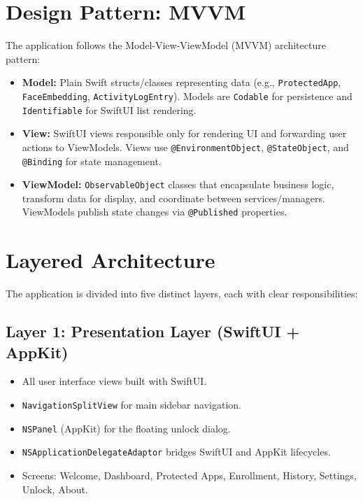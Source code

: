 \documentclass[12pt,a4paper]{report}
\begin{document}
\section{Design Pattern: MVVM}
The application follows the Model-View-ViewModel (MVVM) architecture pattern:

\begin{itemize}
    \item \textbf{Model:} Plain Swift structs/classes representing data (e.g., \texttt{ProtectedApp}, \texttt{FaceEmbedding}, \texttt{ActivityLogEntry}). Models are \texttt{Codable} for persistence and \texttt{Identifiable} for SwiftUI list rendering.
    
    \item \textbf{View:} SwiftUI views responsible only for rendering UI and forwarding user actions to ViewModels. Views use \texttt{@EnvironmentObject}, \texttt{@StateObject}, and \texttt{@Binding} for state management.
    
    \item \textbf{ViewModel:} \texttt{ObservableObject} classes that encapsulate business logic, transform data for display, and coordinate between services/managers. ViewModels publish state changes via \texttt{@Published} properties.
\end{itemize}

\section{Layered Architecture}
The application is divided into five distinct layers, each with clear responsibilities:

\subsection{Layer 1: Presentation Layer (SwiftUI + AppKit)}
\begin{itemize}[noitemsep]
    \item All user interface views built with SwiftUI.
    \item \texttt{NavigationSplitView} for main sidebar navigation.
    \item \texttt{NSPanel} (AppKit) for the floating unlock dialog.
    \item \texttt{NSApplicationDelegateAdaptor} bridges SwiftUI and AppKit lifecycles.
    \item Screens: Welcome, Dashboard, Protected Apps, Enrollment, History, Settings, Unlock, About.
\end{itemize}
\end{document}
